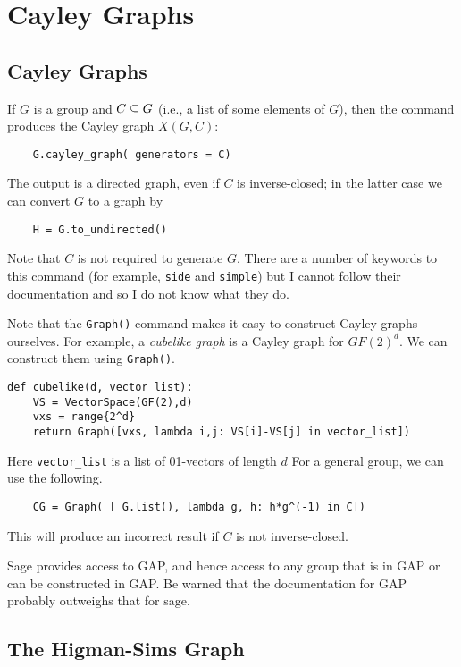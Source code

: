 
\chapter{Cayley Graphs}

\section{Cayley Graphs}

If $G$ is a group and $C\subseteq G$ (i.e., a list of some elements of $G$), then the 
command produces the Cayley graph $X(G,C)$:
\begin{verbatim}
    G.cayley_graph( generators = C)
\end{verbatim}
The output is a directed graph, even if $C$ is inverse-closed; in the latter
case we can convert $G$ to a graph by
\begin{verbatim}
    H = G.to_undirected()
\end{verbatim}
Note that $C$ is not required to generate $G$. There are a number of keywords
to this command (for example, \texttt{side} and \texttt{simple}) but I cannot
follow their documentation and so I do not know what they do.

Note that the \texttt{Graph()} command makes it easy to construct Cayley
graphs ourselves. For example, a \textsl{cubelike graph} is a Cayley
graph for $GF(2)^d$. We can construct them using \texttt{Graph()}.
\begin{verbatim}
def cubelike(d, vector_list):
    VS = VectorSpace(GF(2),d)
    vxs = range{2^d}
    return Graph([vxs, lambda i,j: VS[i]-VS[j] in vector_list])
\end{verbatim}
Here \verb|vector_list| is a list of 01-vectors of length $d$
For a general group, we can use the following.
\begin{verbatim}
    CG = Graph( [ G.list(), lambda g, h: h*g^(-1) in C])
\end{verbatim}
This will produce an incorrect result if $C$ is not inverse-closed.

Sage provides access to GAP, and hence access to any group that is
in GAP or can be constructed in GAP.  Be warned that the documentation
for GAP probably outweighs that for sage.


\section{The Higman-Sims Graph}

